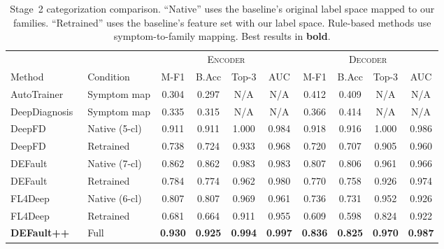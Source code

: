 \begin{table}[!htbp]
\centering
\caption{Stage~2 categorization comparison. ``Native'' uses the baseline's original label space mapped to our families. ``Retrained'' uses the baseline's feature set with our label space. Rule-based methods use symptom-to-family mapping. Best results in \textbf{bold}.}
\label{tab:baseline_categorization}
\small
\setlength{\tabcolsep}{3pt}
\begin{tabular}{l l cccc cccc}
\toprule
& & \multicolumn{4}{c}{\textsc{Encoder}} & \multicolumn{4}{c}{\textsc{Decoder}} \\
\cmidrule(lr){3-6}\cmidrule(lr){7-10}
Method & Condition & M-F1 & B.Acc & Top-3 & AUC & M-F1 & B.Acc & Top-3 & AUC \\
\midrule
AutoTrainer~\cite{autotrainer} & Symptom map & 0.304 & 0.297 & N/A & N/A & 0.412 & 0.409 & N/A & N/A \\
DeepDiagnosis~\cite{deepdiagnosis} & Symptom map & 0.335 & 0.315 & N/A & N/A & 0.366 & 0.414 & N/A & N/A \\
\addlinespace
DeepFD~\cite{deepfd} & Native (5-cl) & 0.911 & 0.911 & 1.000 & 0.984 & 0.918 & 0.916 & 1.000 & 0.986 \\
DeepFD~\cite{deepfd} & Retrained & 0.738 & 0.724 & 0.933 & 0.968 & 0.720 & 0.707 & 0.905 & 0.960 \\
\addlinespace
DEFault~\cite{default} & Native (7-cl) & 0.862 & 0.862 & 0.983 & 0.983 & 0.807 & 0.806 & 0.961 & 0.966 \\
DEFault~\cite{default} & Retrained & 0.784 & 0.774 & 0.962 & 0.980 & 0.770 & 0.758 & 0.926 & 0.974 \\
\addlinespace
FL4Deep~\cite{fl4deep} & Native (6-cl) & 0.807 & 0.807 & 0.969 & 0.961 & 0.736 & 0.731 & 0.952 & 0.926 \\
FL4Deep~\cite{fl4deep} & Retrained & 0.681 & 0.664 & 0.911 & 0.955 & 0.609 & 0.598 & 0.824 & 0.922 \\
\addlinespace
\midrule
\textbf{DEFault++} & Full & \textbf{0.930} & \textbf{0.925} & \textbf{0.994} & \textbf{0.997} & \textbf{0.836} & \textbf{0.825} & \textbf{0.970} & \textbf{0.987} \\
\bottomrule
\end{tabular}
\end{table}

